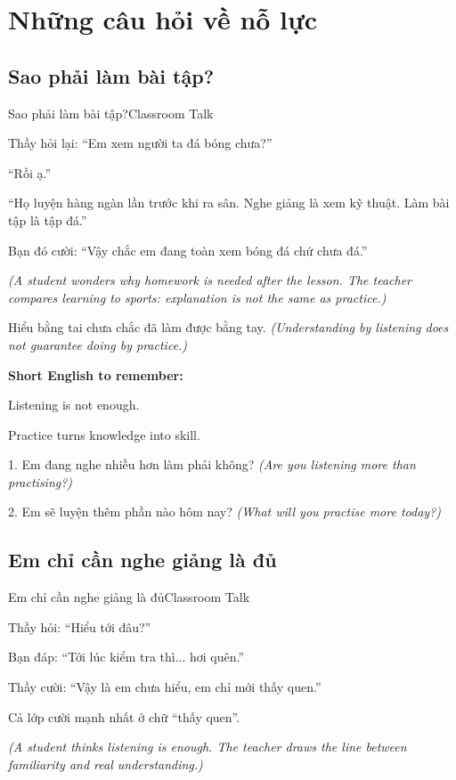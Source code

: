 \chapter{Những câu hỏi về nỗ lực}

\section{Sao phải làm bài tập?}
\begin{truyen}{Sao phải làm bài tập?}{Classroom Talk}

Thầy hỏi lại: ``Em xem người ta đá bóng chưa?''

``Rồi ạ.''

``Họ luyện hàng ngàn lần trước khi ra sân. Nghe giảng là xem kỹ thuật. Làm bài tập là tập đá.''

Bạn đó cười: ``Vậy chắc em đang toàn xem bóng đá chứ chưa đá.''

\textit{(A student wonders why homework is needed after the lesson. The teacher compares learning to sports: explanation is not the same as practice.)}
\end{truyen}

\begin{baihoc}
Hiểu bằng tai chưa chắc đã làm được bằng tay.
\textit{(Understanding by listening does not guarantee doing by practice.)}
\end{baihoc}

\begin{ghinhoanh}
\textbf{Short English to remember:}

Listening is not enough.

Practice turns knowledge into skill.
\end{ghinhoanh}

\begin{tuhocnhanh}
1. Em đang nghe nhiều hơn làm phải không? \textit{(Are you listening more than practising?)}

2. Em sẽ luyện thêm phần nào hôm nay? \textit{(What will you practise more today?)}
\end{tuhocnhanh}
\ngancach

\section{Em chỉ cần nghe giảng là đủ}
\begin{truyen}{Em chỉ cần nghe giảng là đủ}{Classroom Talk}

Thầy hỏi: ``Hiểu tới đâu?''

Bạn đáp: ``Tới lúc kiểm tra thì... hơi quên.''

Thầy cười: ``Vậy là em chưa hiểu, em chỉ mới thấy quen.''

Cả lớp cười mạnh nhất ở chữ ``thấy quen''.

\textit{(A student thinks listening is enough. The teacher draws the line between familiarity and real understanding.)}
\end{truyen}

